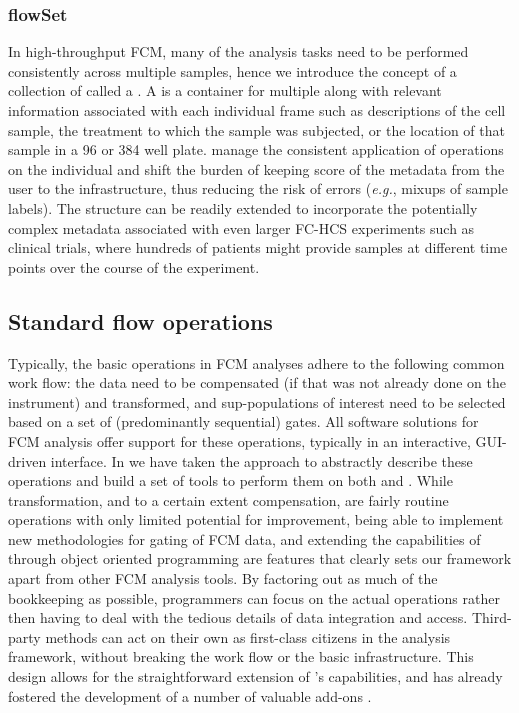 \documentclass[10pt]{bmc_article}
\newenvironment{bmcformat}{\begin{raggedright}\baselineskip20pt\sloppy\setboolean{publ}{false}}{\end{raggedright}\baselineskip20pt\sloppy}
\begin{document}
\begin{bmcformat}
\subsubsection*{flowSet}
In high-throughput FCM, many of the analysis tasks need to be
performed consistently across multiple samples, hence we introduce the
concept of a collection of  called a
. A  is a container for multiple
 along with relevant information associated with
each individual frame such as descriptions of the cell sample, the
treatment to which the sample was subjected, or the location of that
sample in a 96 or 384 well plate.   manage the
consistent application of operations on the individual
 and shift the burden of keeping score of the
metadata from the user to the infrastructure, thus reducing the risk
of errors (\textit{e.g.}, mixups of sample labels). The
 structure can be readily extended to incorporate the
potentially complex metadata associated with even larger FC-HCS
experiments such as clinical trials, where hundreds of patients might
provide samples at different time points over the course of the
experiment.

\subsection*{Standard flow operations}

Typically, the basic operations in FCM analyses adhere to the
following common work flow: the data need to be compensated (if that
was not already done on the instrument) and transformed, and
sup-populations of interest need to be selected based on a set of
(predominantly sequential) gates. All software solutions for FCM
analysis offer support for these operations, typically in an
interactive, GUI-driven interface. In  we have
taken the approach to abstractly describe these operations and build a
set of tools to perform them on both  and
. While transformation, and to a certain extent
compensation, are fairly routine operations with only limited
potential for improvement, being able to implement new methodologies
for gating of FCM data, and extending the capabilities of
 through object oriented programming are features
that clearly sets our framework apart from other FCM analysis
tools. By factoring out as much of the bookkeeping as possible,
programmers can focus on the actual operations rather then having to
deal with the tedious details of data integration and
access. Third-party methods can act on their own as first-class
citizens in the analysis framework, without breaking the work flow or
the basic infrastructure. This design allows for the straightforward
extension of 's capabilities, and has already
fostered the development of a number of valuable add-ons
\citep{lo2008agf,sarkar2008ufv}.


\end{bmcformat}
\end{document}
